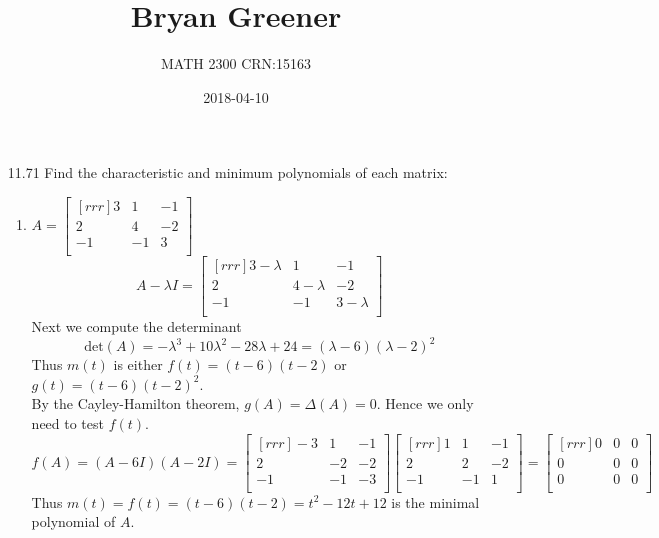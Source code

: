 \documentclass[12pt]{article}
\title{Bryan Greener}
\author{MATH 2300 CRN:15163}
\date{2018-04-10}
\theoremstyle{definition}
\theoremstyle{plain}
\begin{document}
\maketitle

\TabPositions{4cm}

\begin{enumerate}
\item[11.71]Find the characteristic and minimum polynomials of each matrix:
	\begin{enumerate}
	\item $A=\begin{bmatrix}[rrr]3&1&-1\\2&4&-2\\-1&-1&3\\\end{bmatrix}$\\
	\[ A-\lambda I = \begin{bmatrix}[rrr]3-\lambda & 1 & -1\\2&4-\lambda &-2\\-1&-1&3-\lambda\\\end{bmatrix} \]
	Next we compute the determinant
	\[ \mathrm{det}(A) = -\lambda^3+10\lambda^2-28\lambda+24 = (\lambda-6)(\lambda-2)^2 \]
	Thus $m(t)$ is either $f(t)=(t-6)(t-2)$ or $g(t)=(t-6)(t-2)^2$.\\
	By the Cayley-Hamilton theorem, $g(A)=\Delta(A)=0$. Hence we only need to test $f(t)$.
	\[ f(A)=(A-6I)(A-2I) = \begin{bmatrix}[rrr]-3&1&-1\\2&-2&-2\\-1&-1&-3\\\end{bmatrix}\begin{bmatrix}[rrr]1&1&-1\\2&2&-2\\-1&-1&1\\\end{bmatrix} = \begin{bmatrix}[rrr]0&0&0\\0&0&0\\0&0&0\\\end{bmatrix} \]
	Thus $m(t)=f(t)=(t-6)(t-2)=t^2-12t+12$ is the minimal polynomial of $A$.
	

\end{enumerate}
\end{enumerate}
\end{document}
